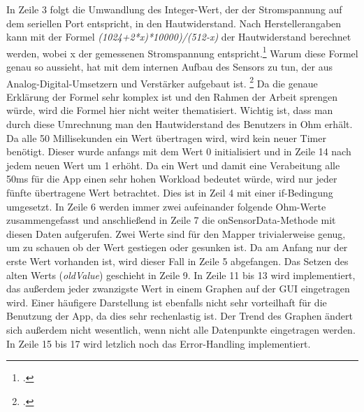 In Zeile 3 folgt die Umwandlung des Integer-Wert, der der Stromspannung auf dem seriellen Port entspricht, in den Hautwiderstand. \newline Nach Herstellerangaben kann mit der Formel \textit{(1024+2*x)*10000)/(512-x)} der Hautwiderstand berechnet werden, wobei x der gemessenen Stromspannung entspricht.\footcite[Vgl.][]{Gro18} Warum diese Formel genau so aussieht, hat mit dem internen Aufbau des Sensors zu tun, der aus Analog-Digital-Umsetzern und Verstärker aufgebaut ist. \footcite[Vgl.][1. Forumsantwort]{Com18} Da die genaue Erklärung der Formel sehr komplex ist und den Rahmen der Arbeit sprengen würde, wird die Formel hier nicht weiter thematisiert. Wichtig ist, dass man durch diese Umrechnung man den Hautwiderstand des Benutzers in Ohm erhält. \newline
Da alle 50 Millisekunden ein Wert übertragen wird, wird kein neuer Timer benötigt. Dieser wurde anfangs mit dem Wert 0 initialisiert und in Zeile 14 nach jedem neuen Wert um 1 erhöht. Da ein Wert und damit eine Verabeitung alle 50ms für die App einen sehr hohen Workload bedeutet würde, wird nur jeder fünfte übertragene Wert betrachtet. Dies ist in Zeil 4 mit einer if-Bedingung umgesetzt. In Zeile 6 werden immer zwei aufeinander folgende Ohm-Werte zusammengefasst und anschließend in Zeile 7 die onSensorData-Methode mit diesen Daten aufgerufen. Zwei Werte sind für den Mapper trivialerweise genug, um zu schauen ob der Wert gestiegen oder gesunken ist. Da am Anfang nur der erste Wert vorhanden ist, wird dieser Fall in Zeile 5 abgefangen. Das Setzen des alten Werts (\textit{oldValue}) geschieht in Zeile 9. \newline
In Zeile 11 bis 13 wird implementiert, das außerdem jeder zwanzigste Wert in einem Graphen auf der GUI eingetragen wird. Einer häufigere Darstellung ist ebenfalls nicht sehr vorteilhaft für die Benutzung der App, da dies sehr rechenlastig ist. Der Trend des Graphen ändert sich außerdem nicht wesentlich, wenn nicht alle Datenpunkte eingetragen werden. \newline
In Zeile 15 bis 17 wird letzlich noch das Error-Handling implementiert.
